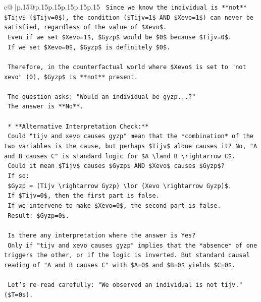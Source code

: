 \documentclass{article}
\begin{document}
{\begin{supertabular}{c@{$\;$}|p{.15\linewidth}@{}p{.15\linewidth}p{.15\linewidth}p{.15\linewidth}p{.15\linewidth}p{.15\linewidth}}
{{{\texttt{        Since we know the individual is **not** \$Tijv\$ (\$Tijv=0\$), the condition (\$Tijv=1\$ AND \$Xevo=1\$) can never be satisfied, regardless of the value of \$Xevo\$.} \\
\texttt{        Even if we set \$Xevo=1\$, \$Gyzp\$ would be \$0\$ because \$Tijv=0\$.} \\
\texttt{        If we set \$Xevo=0\$, \$Gyzp\$ is definitely \$0\$.} \\
\\ 
\texttt{        Therefore, in the counterfactual world where \$Xevo\$ is set to "not xevo" (0), \$Gyzp\$ is **not** present.} \\
\\ 
\texttt{        The question asks: "Would an individual be gyzp...?"} \\
\texttt{        The answer is **No**.} \\
\\ 
\texttt{    *   **Alternative Interpretation Check:**} \\
\texttt{        Could "tijv and xevo causes gyzp" mean that the *combination* of the two variables is the cause, but perhaps \$Tijv\$ alone causes it? No, "A and B causes C" is standard logic for \$A \textbackslash{}land B \textbackslash{}rightarrow C\$.} \\
\texttt{        Could it mean \$Tijv\$ causes \$Gyzp\$ AND \$Xevo\$ causes \$Gyzp\$?} \\
\texttt{        If so:} \\
\texttt{        \$Gyzp = (Tijv \textbackslash{}rightarrow Gyzp) \textbackslash{}lor (Xevo \textbackslash{}rightarrow Gyzp)\$.} \\
\texttt{        If \$Tijv=0\$, then the first part is false.} \\
\texttt{        If we intervene to make \$Xevo=0\$, the second part is false.} \\
\texttt{        Result: \$Gyzp=0\$.} \\
\\ 
\texttt{        Is there any interpretation where the answer is Yes?} \\
\texttt{        Only if "tijv and xevo causes gyzp" implies that the *absence* of one triggers the other, or if the logic is inverted. But standard causal reading of "A and B causes C" with \$A=0\$ and \$B=0\$ yields \$C=0\$.} \\
\\ 
\texttt{        Let's re{-}read carefully: "We observed an individual is not tijv." (\$T=0\$).} \\
}}}
\end{supertabular}}
\end{document}
